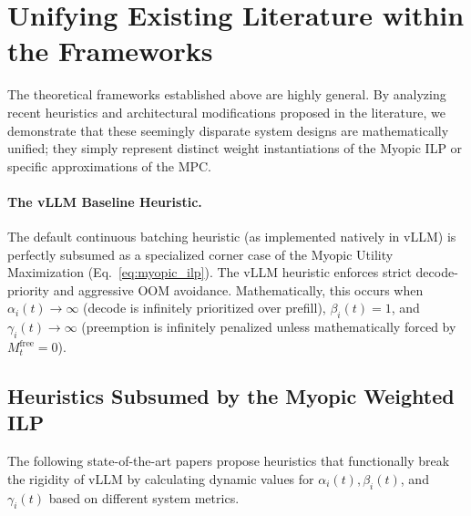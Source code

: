 \documentclass[11pt]{article}
\begin{document}
\section{Unifying Existing Literature within the Frameworks}
\label{sec:unifying_literature}

The theoretical frameworks established above are highly general. By analyzing recent heuristics and architectural modifications proposed in the literature, we demonstrate that these seemingly disparate system designs are mathematically unified; they simply represent distinct weight instantiations of the Myopic ILP or specific approximations of the MPC.

\paragraph{The vLLM Baseline Heuristic.} 
The default continuous batching heuristic (as implemented natively in vLLM) is perfectly subsumed as a specialized corner case of the Myopic Utility Maximization (Eq.~\ref{eq:myopic_ilp}). The vLLM heuristic enforces strict decode-priority and aggressive OOM avoidance. Mathematically, this occurs when $\alpha_i(t) \to \infty$ (decode is infinitely prioritized over prefill), $\beta_i(t) = 1$, and $\gamma_i(t) \to \infty$ (preemption is infinitely penalized unless mathematically forced by $M_t^{\mathrm{free}} = 0$).

\subsection{Heuristics Subsumed by the Myopic Weighted ILP}
\label{subsec:subsumed_ilp}

The following state-of-the-art papers propose heuristics that functionally break the rigidity of vLLM by calculating dynamic values for $\alpha_i(t), \beta_i(t)$, and $\gamma_i(t)$ based on different system metrics.
\end{document}
